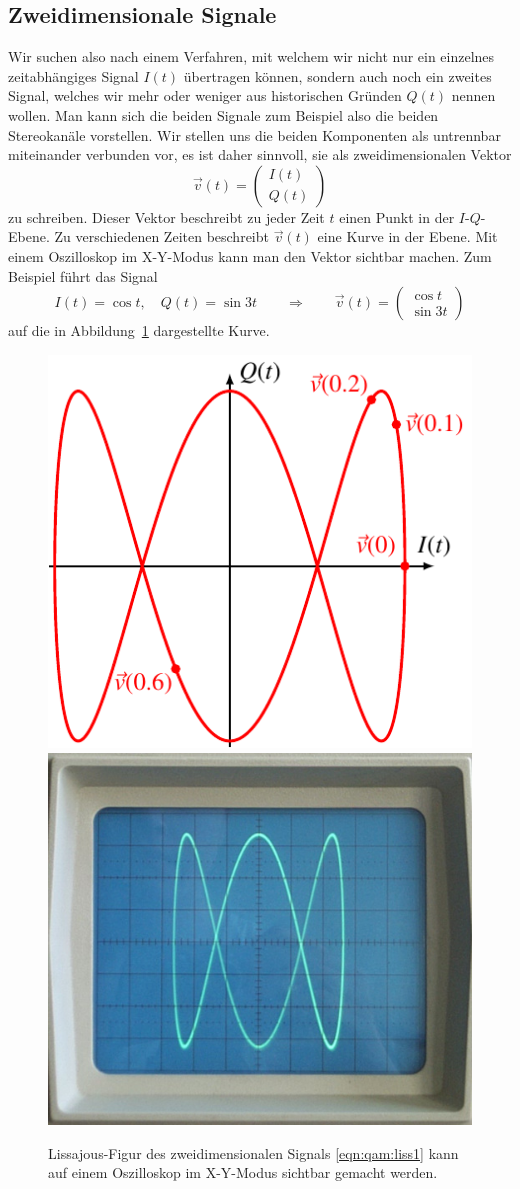 %
%
%
\subsection{Zweidimensionale Signale
\label{subsection:qam:zweidimensional}}
Wir suchen also nach einem Verfahren, mit welchem wir nicht nur
ein einzelnes zeitabhängiges Signal $I(t)$ übertragen können, sondern
auch noch ein zweites Signal, welches wir mehr oder weniger aus
historischen Gründen $Q(t)$ nennen wollen.
Man kann sich die beiden Signale zum Beispiel also die beiden
Stereokanäle vorstellen.
Wir stellen uns die beiden Komponenten als untrennbar miteinander
verbunden vor, es ist daher sinnvoll, sie als zweidimensionalen Vektor
\[
\vec{v}(t)
=
\begin{pmatrix}I(t)\\Q(t)\end{pmatrix}
\]
zu schreiben.
Dieser Vektor beschreibt zu jeder Zeit $t$ einen Punkt in der
$I$-$Q$-Ebene.
Zu verschiedenen Zeiten beschreibt $\vec{v}(t)$ eine Kurve
in der Ebene.
Mit einem Oszilloskop im X-Y-Modus kann man den Vektor
sichtbar machen.
Zum Beispiel führt das Signal
\begin{equation}
I(t) = \cos t,\quad
Q(t) = \sin 3t
\qquad
\Rightarrow
\qquad
\vec{v}(t)
=
\begin{pmatrix}
\cos t\\
\sin 3t
\end{pmatrix}
\label{eqn:qam:liss1}
\end{equation}
auf die in Abbildung~\ref{figure:qam:lissajous} dargestellte Kurve.
\begin{figure}
\centering
\includegraphics[width=0.48\hsize]{applications/qam/lissajous.pdf}
\includegraphics[width=0.48\hsize]{applications/qam/lissajous.jpg}
\caption{Lissajous-Figur des zweidimensionalen Signals
\eqref{eqn:qam:liss1} kann auf einem Oszilloskop im X-Y-Modus
sichtbar gemacht werden.
\label{figure:qam:lissajous}}
\end{figure}
